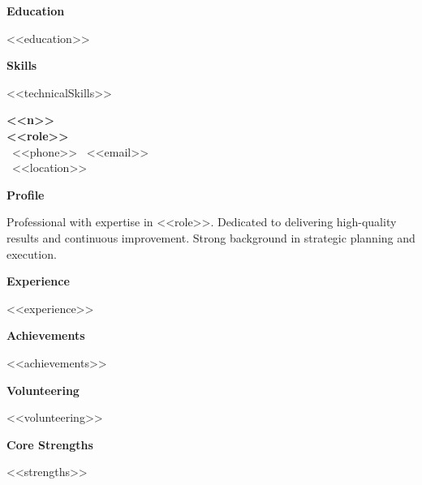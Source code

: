 \documentclass[11pt,a4paper]{article}
\newcommand{\classsec}[1]{%
  \vspace{8pt}%
  {\fontsize{14pt}{16pt}\selectfont\bfseries\color{textdark} #1}%
  \vspace{4pt}%
  \newline%
}
\begin{document}
\noindent
\begin{minipage}[t]{0.35\linewidth}
  \colorbox{primaryyellow}{%
    \begin{minipage}[c]{0.95\linewidth}
      \vspace{70pt}
      \hfill
      \vspace{70pt}
    \end{minipage}%
  }
  
  \vspace{15pt}
  
  \classsec{Education}
  <<education>>
  
  \vspace{10pt}
  
  \classsec{Skills}
  <<technicalSkills>>
  
\end{minipage}%
\hfill
\begin{minipage}[t]{0.60\linewidth}
  
  \vspace{-10pt}
  {\fontsize{32pt}{36pt}\selectfont\bfseries\color{textdark} <<n>>}\\[3pt]
  \colorbox{primaryyellow}{{\fontsize{11pt}{12pt}\selectfont\bfseries\color{textdark} \hspace{5pt}<<role>>\hspace{5pt}}}\\[8pt]
  {\fontsize{9.5pt}{11pt}\selectfont\color{textlight}
    \textbullet~<<phone>> \quad \textbullet~<<email>> \\
    \textbullet~<<location>>
  }
  
  \vspace{15pt}
  
  \classsec{Profile}
  {\fontsize{10pt}{11pt}\selectfont\color{textlight}
    Professional with expertise in <<role>>. Dedicated to delivering high-quality results and continuous improvement. Strong background in strategic planning and execution.
  }
  
  \vspace{12pt}
  
  \classsec{Experience}
  <<experience>>
  
  \vspace{10pt}
  
  \classsec{Achievements}
  <<achievements>>
  
  \vspace{10pt}
  
  \classsec{Volunteering}
  <<volunteering>>
  
  \vspace{10pt}
  
  \classsec{Core Strengths}
  <<strengths>>
  
\end{minipage}
\end{document}
